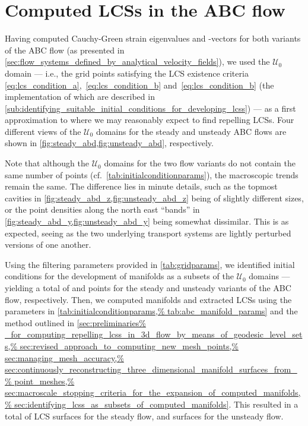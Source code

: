 \section{Computed LCSs in the ABC flow}
\label{sec:computed_lcss_in_the_abc_flow}

Having computed Cauchy-Green strain eigenvalues and -vectors for both
variants of the ABC flow (as presented in
\cref{sec:flow_systems_defined_by_analytical_velocity_fields}), we used
the $\mathcal{U}_{0}$ domain --- i.e., the grid points satisfying the LCS
existence criteria~ \eqref{eq:lcs_condition_a},~\eqref{eq:lcs_condition_b}
and~\eqref{eq:lcs_condition_b} (the implementation of which are
described in
\cref{sub:identifying_suitable_initial_conditions_for_developing_lcss}) --- as
a first approximation to where we may reasonably expect to find repelling LCSs.
Four different views of the $\mathcal{U}_{0}$ domains for the steady
and unsteady ABC flows are shown in \cref{fig:steady_abd,fig:unsteady_abd},
respectively.





Note that although the $\mathcal{U}_{0}$ domains for the two
flow variants do not contain the same number of points (cf.\
\cref{tab:initialconditionparams}), the macroscopic trends remain the same. The
difference lies in minute details, such as the topmost cavities in
\cref{fig:steady_abd_z,fig:unsteady_abd_z} being of slightly different sizes,
or the point densities along the north east ``bands'' in
\cref{fig:steady_abd_y,fig:unsteady_abd_y} being somewhat dissimilar. This is
as expected, seeing as the two underlying transport systems are lightly
perturbed versions of one another.

Using the filtering parameters provided in \cref{tab:gridparams}, we identified
initial conditions for the development of manifolds as a subsets of the
$\mathcal{U}_{0}$ domains --- yielding a total of \numprint{618} and
\numprint{676} points for the steady and unsteady variants of the ABC flow,
respectively.  Then, we computed manifolds and extracted LCSs using the
parameters in \cref{tab:initialconditionparams,%
tab:abc_manifold_params} and the method outlined in \cref{sec:preliminaries%
_for_computing_repelling_lcss_in_3d_flow_by_means_of_geodesic_level_sets,%
    sec:revised_approach_to_computing_new_mesh_points,%
    sec:managing_mesh_accuracy,%
    sec:continuously_reconstructing_three_dimensional_manifold_surfaces_from_%
    point_meshes,%
    sec:macroscale_stopping_criteria_for_the_expansion_of_computed_manifolds,%
    sec:identifying_lcss_as_subsets_of_computed_manifolds}. This resulted
in a total of \numprint{22} LCS surfaces for the steady flow, and
\numprint{31} surfaces for the unsteady flow.

